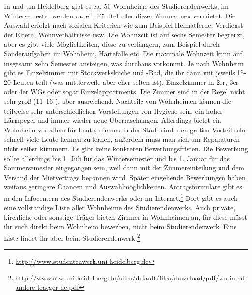 In und um Heidelberg gibt es ca. 50 Wohnheime des Studierendenwerks, im Wintersemester werden ca. ein Fünftel aller dieser Zimmer neu vermietet. Die Auswahl erfolgt nach sozialen Kriterien wie zum Beispiel Heimatferne, Verdienst der Eltern, Wohnverhältnisse usw. Die Wohnzeit ist auf sechs Semester begrenzt, aber es gibt viele Möglichkeiten, diese zu verlängern, zum Beispiel durch Sonderaufgaben im Wohnheim, Härtefälle etc. Die maximale Wohnzeit kann auf insgesamt zehn Semester ansteigen, was durchaus vorkommt. Je nach Wohnheim gibt es Einzelzimmer mit Stockwerksküche und -Bad, die ihr dann mit jeweils 15-20 Leuten teilt (was mittlerweile aber eher selten ist), Einzelzimmer in 2er, 3er oder 4er WGs oder sogar Einzelappartments. Die Zimmer sind in der Regel nicht sehr groß (11--16 \squaren\metre), aber ausreichend. Nachteile von Wohnheimen können die teilweise sehr unterschiedlichen Vorstellungen von Hygiene sein, ein hoher Lärmpegel und immer wieder neue Überraschungen. Allerdings bietet ein Wohnheim vor allem für Leute, die neu in der Stadt sind, den großen Vorteil sehr schnell viele Leute kennen zu lernen, außerdem muss man sich um Reparaturen nicht selbst kümmern. Es gibt keine konkreten Bewerbungsfristen. Die Bewerbung sollte allerdings bis 1. Juli für das Wintersemester und bis 1. Januar für das Sommersemester eingegangen sein, weil dann mit der Zimmereinteilung und dem Versand der Mietverträge begonnen wird. Später eingehende Bewerbungen haben weitaus geringere Chancen und Auswahlmöglichkeiten. Antragsformulare gibt es in den Infocentern des Studierendenwerks oder im Internet.\footnote{\url{http://www.studentenwerk.uni-heidelberg.de}} Dort gibt es auch eine vollständige Liste aller Wohnheime des Studierendenwerks. Auch private, kirchliche oder sonstige Träger bieten Zimmer in Wohnheimen an, für diese müsst ihr euch direkt beim Wohnheim bewerben, nicht beim Studierendenwerk. Eine Liste findet ihr aber beim Studierendenwerk.\footnote{\url{http://www.stw.uni-heidelberg.de/sites/default/files/download/pdf/wo-in-hd-andere-traeger-de.pdf}}
